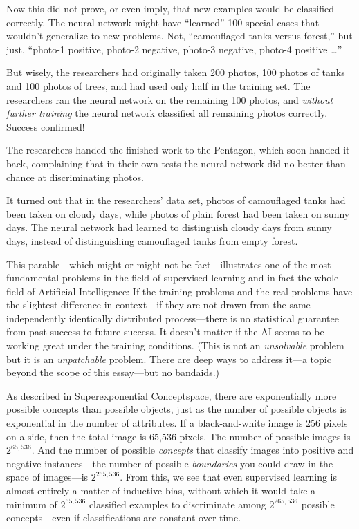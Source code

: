 {
 Now this did not prove, or even imply, that new examples would be
classified correctly. The neural network might have
``learned'' 100 special cases that
wouldn't generalize to new problems. Not,
``camouflaged tanks versus forest,''
but just, ``photo-1 positive, photo-2 negative,
photo-3 negative, photo-4 positive \ldots''}

{
 But wisely, the researchers had originally taken 200 photos, 100
photos of tanks and 100 photos of trees, and had used only half in the
training set. The researchers ran the neural network on the remaining
100 photos, and \textit{without further training} the neural network
classified all remaining photos correctly. Success confirmed!}

{
 The researchers handed the finished work to the Pentagon, which
soon handed it back, complaining that in their own tests the neural
network did no better than chance at discriminating photos.}

{
 It turned out that in the researchers' data set,
photos of camouflaged tanks had been taken on cloudy days, while photos
of plain forest had been taken on sunny days. The neural network had
learned to distinguish cloudy days from sunny days, instead of
distinguishing camouflaged tanks from empty forest.}

{
 This parable---which might or might not be fact---illustrates one
of the most fundamental problems in the field of supervised learning
and in fact the whole field of Artificial Intelligence: If the training
problems and the real problems have the slightest difference in
context---if they are not drawn from the same independently identically
distributed process---there is no statistical guarantee from past
success to future success. It doesn't matter if the AI
seems to be working great under the training conditions. (This is not
an \textit{unsolvable} problem but it is an \textit{unpatchable}
problem. There are deep ways to address it---a topic beyond the scope
of this essay---but no bandaids.)}

{
 As described in Superexponential Conceptspace, there are
exponentially more possible concepts than possible objects, just as the
number of possible objects is exponential in the number of attributes.
If a black-and-white image is 256 pixels on a side, then the total
image is 65,536 pixels. The number of possible images is
$2^{65,536}$. And the number of possible \textit{concepts}
that classify images into positive and negative instances---the number
of possible \textit{boundaries} you could draw in the space of
images---is $2^{265,536}$. From this, we see that even
supervised learning is almost entirely a matter of inductive bias,
without which it would take a minimum of $2^{65,536}$
classified examples to discriminate among $2^{265,536}$
possible concepts---even if classifications are constant over time.}

